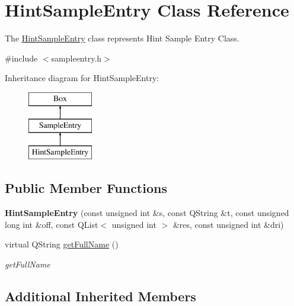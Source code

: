 \hypertarget{class_hint_sample_entry}{\section{Hint\-Sample\-Entry Class Reference}
\label{class_hint_sample_entry}
}


The \hyperlink{class_hint_sample_entry}{Hint\-Sample\-Entry} class represents Hint Sample Entry Class.  




{\ttfamily \#include $<$sampleentry.\-h$>$}

Inheritance diagram for Hint\-Sample\-Entry\-:\begin{figure}[H]
\begin{center}
\leavevmode
\includegraphics[height=3.000000cm]{class_hint_sample_entry}
\end{center}
\end{figure}
\subsection*{Public Member Functions}
\begin{DoxyCompactItemize}
\item 
\hypertarget{class_hint_sample_entry_a397c7c3c154952813b41d5c9fa95b8f4}{{\bfseries Hint\-Sample\-Entry} (const unsigned int \&s, const Q\-String \&t, const unsigned long int \&off, const Q\-List$<$ unsigned int $>$ \&res, const unsigned int \&dri)}\label{class_hint_sample_entry_a397c7c3c154952813b41d5c9fa95b8f4}

\item 
virtual Q\-String \hyperlink{class_hint_sample_entry_ac747c305de54a619efe66d5d8e0ec61a}{get\-Full\-Name} ()
\begin{DoxyCompactList}\small\item\em get\-Full\-Name \end{DoxyCompactList}\end{DoxyCompactItemize}
\subsection*{Additional Inherited Members}


